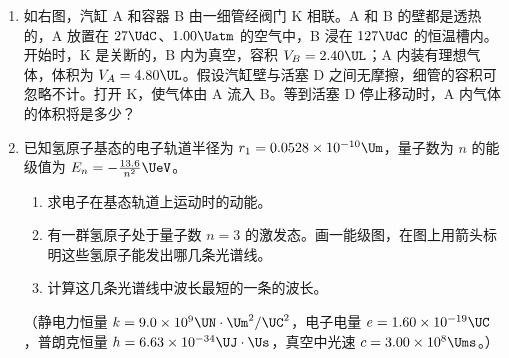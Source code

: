 \documentclass[\gkver]{gaokaozhenti}
\begin{document}
\begin{enumerate}
\item
如右图，汽缸 A 和容器 B 由一细管经阀门 K 相联。A 和 B 的壁都是透热的，A 放置在 $27\UdC$、$1.00\Uatm$ 的空气中，B 浸在 $127\UdC$ 的恒温槽内。开始时，K 是关断的，B 内为真空，容积 $V_{B}=2.40\UL$；A 内装有理想气体，体积为 $V_{A}=4.80\UL$。假设汽缸壁与活塞 D 之间无摩擦，细管的容积可忽略不计。打开 K，使气体由 A 流入 B。等到活塞 D 停止移动时，A 内气体的体积将是多少？
\jdanswer{
$3.00\UL$
}

\item
已知氢原子基态的电子轨道半径为 $r_{1}=0.0528\times10^{-10}\Um$，量子数为 $n$ 的能级值为 $E_{n}=-\frac{13.6}{n^{2}}\UeV$。
\begin{enumerate}
	\item
	求电子在基态轨道上运动时的动能。
	\item
	有一群氢原子处于量子数 $n=3$ 的激发态。画一能级图，在图上用箭头标明这些氢原子能发出哪几条光谱线。
	\item
	计算这几条光谱线中波长最短的一条的波长。
\end{enumerate}
（静电力恒量 $k=9.0\times10^{9}\UN\cdot\Um^{2}/\UC^{2}$，电子电量 $e=1.60\times10^{-19}\UC$，普朗克恒量 $h=6.63\times10^{-34}\UJ\cdot\Us$，真空中光速 $c=3.00\times10^{8}\Ums$。）
\jdanswer{
\begin{enumerate}
	\item
	$13.6\UeV$


\end{enumerate}}
\end{enumerate}
\end{document}
